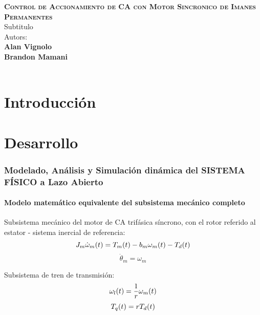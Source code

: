 \documentclass{article}
\begin{document}
\begin{titlepage}
    \centering
    \vspace*{3cm}
    \Huge\textbf{\textsc{Control de Accionamiento de CA con Motor Sincronico de Imanes Permanentes}}\\
    \vspace{1.5cm}
    \large{Subtitulo}\\
    \vspace{10cm}
    \large{Autors:}\\
    \large{\textbf{Alan Vignolo\\Brandon Mamani}}\\
    \vfill
    \the\year\\ %
\end{titlepage}

\part*{Introducción}

\lipsum

\newpage
\part*{Desarrollo}

\section*{Modelado, Análisis y Simulación dinámica del SISTEMA FÍSICO a Lazo Abierto}
\subsection*{Modelo matemático equivalente del subsistema mecánico completo}

Subsistema mecánico del motor de CA trifásica síncrono, con el rotor referido al estator - sistema inercial de referencia:
\begin{equation}
    \label{eq:1.1}
    J_{m}\dot{\omega}_{m}(t) = T_{m}(t)-b_{m}\omega_{m}(t)-T_{d}(t) \\
\end{equation}
\begin{equation}
    \label{eq:1.2}
    \dot{\theta}_{m} = \omega_{m}
\end{equation}

Subsistema de tren de transmisión:
\begin{equation}
    \label{eq:2.1}
    \omega_{l}(t) = \frac{1}{r}\omega_{m}(t) \\
\end{equation}
\begin{equation}
    \label{eq:2.2}
    T_{q}(t) = rT_{d}(t) \\
\end{equation}
\end{document}
